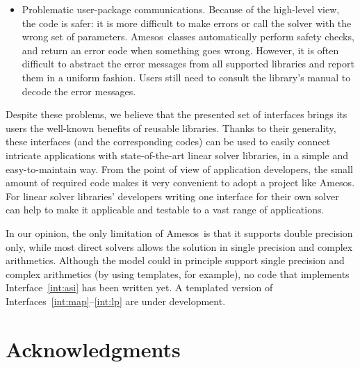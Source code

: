 \documentclass[acmtocl]{acmtrans2m}
\newcommand{\amesos}{{\sc Amesos}}
\begin{document}
\begin{itemize}
\item
Problematic user-package communications. Because of the high-level view, the
code is safer: it is more difficult to make errors or call the solver with the
wrong set of parameters. \amesos\ classes automatically perform safety checks,
      and return an error code when something goes wrong. However,
it is often difficult to abstract the error
messages from all supported libraries and report them in a uniform fashion.
Users still need to consult the library's manual to decode the error messages.
\end{itemize}

%

Despite these problems, we believe that the presented set of interfaces
brings its users the well-known benefits of reusable libraries. Thanks to
their generality, these interfaces (and the corresponding codes) can be used to
easily connect intricate applications with state-of-the-art linear solver
libraries, in a simple and easy-to-maintain way. From the point of view of
application developers, the small amount of required code makes it very
convenient to adopt a project like \amesos. For linear solver
libraries' developers  writing one interface for their own solver can help to make it
applicable and testable to a vast range of applications.

In our opinion, the only limitation of \amesos\ is that it supports double
precision only, while most direct solvers allows the solution in single
precision and complex arithmetics.  Although the model could in principle
support single precision and complex arithmetics (by using templates, for
                                                  example), no code that
implements Interface~\ref{int:asi} has been written yet. A templated version
of Interfaces~\ref{int:map}--\ref{int:lp} are under development.

\section*{Acknowledgments}
\end{document}
